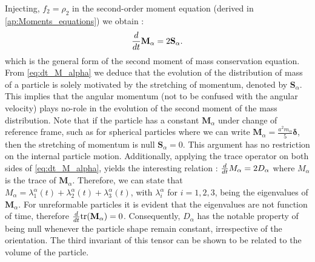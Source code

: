 Injecting, $f_2 = \rho_2$ in the second-order moment equation (derived in \ref{ap:Moments_equations}) we obtain :
\begin{equation}
    \frac{d}{d t} {\textbf{M}_\alpha}=2\textbf{S}_\alpha. 
    \label{eq:dt_M_alpha}
\end{equation}
which is the general form of the second moment of mass conservation equation. 
From \ref{eq:dt_M_alpha} we deduce that the evolution of the distribution of mass of a particle is solely motivated by the stretching of momentum, denoted by $\textbf{S}_\alpha$. 
This implies that the angular momentum (not to be confused with the angular velocity) plays no-role in the evolution of the second moment of the mass distribution. 
Note that if the particle has a constant $\textbf{M}_\alpha$ under change of reference frame, such as for spherical particles where we can write $\textbf{M}_\alpha= \frac{a^2 m_\alpha}{5} \bm\delta$, then the stretching of momentum is null $\textbf{S}_\alpha=0$.
This argument has no restriction on the internal particle motion. 
Additionally, applying the trace operator on both sides of \ref{eq:dt_M_alpha}, yields the interesting relation : $\frac{d}{d t} {M_\alpha}=2D_\alpha$ where $M_\alpha$ is the trace of $\textbf{M}_\alpha$.
Therefore, we can state that $M_\alpha = \lambda^\alpha_1(t)+\lambda^\alpha_2(t)+\lambda^\alpha_3(t)$, with $\lambda_i^\alpha$ for $i=1,2,3$, being the eigenvalues of $\textbf{M}_\alpha$.
For unreformable particles it is evident that the eigenvalues are not function of time, therefore $\frac{d}{d t}{ \text{tr}(\textbf{M}_\alpha)}=0$.  
Consequently, $D_\alpha$ has the notable property of being null whenever the particle shape remain constant, irrespective of the orientation.
The third invariant of this tensor can be shown to be related to the volume of the particle. 

